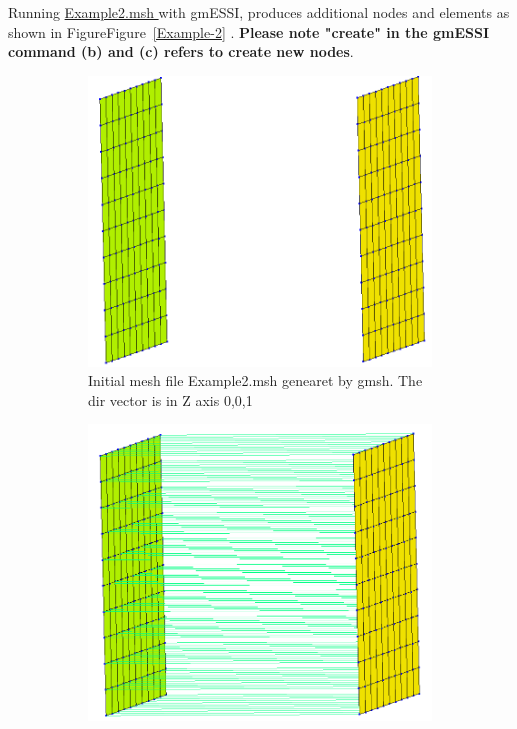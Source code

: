 \documentclass[11pt]{article}
\begin{document}
  \noindent Running \href{http://beta.sumeetsinha.in/gmESSI/Examples/Example2}{
  Example2.msh } with gmESSI, produces additional nodes and elements as shown
  in FigureFigure~\ref{Example-2} . \textbf{Please note "create" in the gmESSI command (b) and (c)
  refers to create new nodes}. 

\begin{figure}[h]
  \centering
  \begin{subfigure}[b]{0.3\textwidth}
    \includegraphics[width=\textwidth,angle=90]{Images/Example2-OriginalMesh.png}
    \caption{Initial mesh file Example2.msh genearet by gmsh. The dir vector is in Z axis {0,0,1} }
  \end{subfigure}\hfill
  \begin{subfigure}[b]{0.3\textwidth}
    \includegraphics[width=\textwidth,angle=90]{Images/Example2-1Layer.png}

\end{subfigure}
\end{figure}
\end{document}
